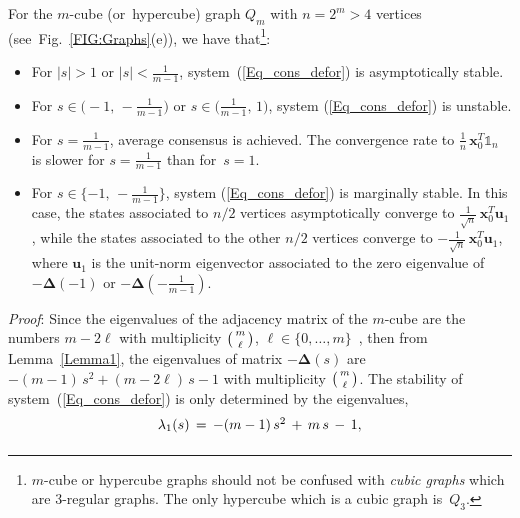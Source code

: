 \documentclass[letterpaper,9pt,twocolumn]{autart}
\newcommand{\vet}[1]{\ensuremath{{\mathbf #1}}}
\begin{document}
\begin{proposition}[$m$-cube $Q_m$]
For the $m$-cube (or~hypercube) graph $Q_m$ with $n = 2^m > 4$ 
vertices (see~Fig.~\ref{FIG:Graphs}(e)), we have that\footnote{$m$-cube or hypercube graphs should not
be confused with \emph{cubic graphs} which are 3-regular graphs. The
only hypercube which is a cubic graph is~$Q_3$.}: \begin{itemize}
\item For $|s| > 1$ or $|s| < \frac{1}{m-1}$, system~(\ref{Eq_cons_defor})
is asymptotically stable.
\item For $s \in \big(\!-1,\,-\frac{1}{m-1}\big)$ or $s \in \big(\frac{1}{m-1},\,1\big)$,
system (\ref{Eq_cons_defor}) is unstable.
\item For $s = \frac{1}{m-1}$, average consensus is achieved. The convergence rate
to $\frac{1}{n}\,\vet{x}_0^T\mathds{1}_{n}$ is slower for $s = \frac{1}{m-1}$ than for~$s = 1$.
\item For $s \in \{-1,\,-\frac{1}{m-1}\}$, system (\ref{Eq_cons_defor}) is marginally stable.
In this case, the states associated to $n/2$ vertices asymptotically converge to
$\frac{1}{\sqrt{n}}\,\vet{x}_0^T\vet{u}_1$, while the states associated to the other
$n/2$ vertices converge to $-\frac{1}{\sqrt{n}}\,\vet{x}_0^T\vet{u}_1$, where $\vet{u}_1$ is the unit-norm eigenvector associated to the zero eigenvalue
of $-\boldsymbol{\Delta}(-1)$ or $-\boldsymbol{\Delta}(-\frac{1}{m-1})$.
\end{itemize}\vspace{-0.2cm}
\emph{Proof}:
Since the eigenvalues of the adjacency matrix of the $m$-cube are the
numbers $m - 2\ell$ with multiplicity
$\left(\begin{smallmatrix}m\vspace{0.1cm}\\\ell \end{smallmatrix}\right)$, $\ell \in
\{0,\ldots,m\}$~\cite[Sect.~1.4.6]{BrouwerHa_book12}, then from
Lemma~\ref{Lemma1}, the eigenvalues of matrix $-\boldsymbol{\Delta}(s)$ 
are $-(m - 1)\,s^2 + (m - 2\ell)\,s - 1$ with multiplicity
$\left(\begin{smallmatrix}m\vspace{0.1cm}\\\ell \end{smallmatrix}\right)$. 
The stability of system~(\ref{Eq_cons_defor}) is only
determined by the eigenvalues, 
$$
\begin{array}{l}
\lambda_{1}(s) \,=\, -(m-1)\,s^2 \,+\, m\,s \,-\, 1,\vspace{0.14cm}\\

\end{array}$$
\end{proposition}
\end{document}
